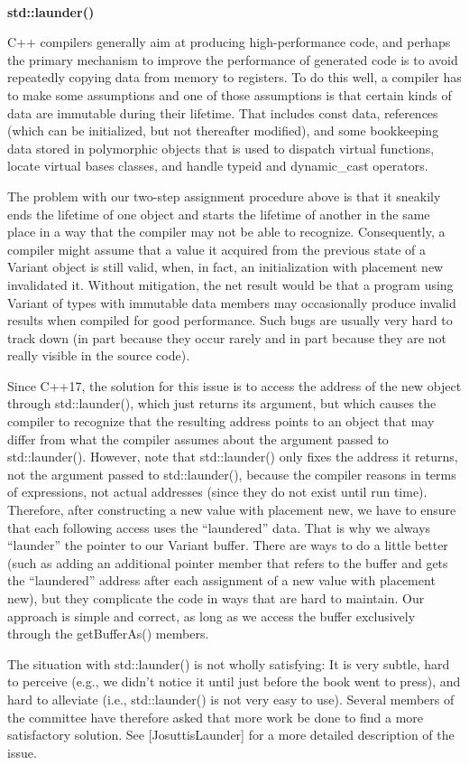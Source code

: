 \hspace*{\fill} \\ %
\noindent
\textbf{std::launder()}

C++ compilers generally aim at producing high-performance code, and perhaps the primary mechanism to improve the performance of generated code is to avoid repeatedly copying data from memory to registers. To do this well, a compiler has to make some assumptions and one of those assumptions is that certain kinds of data are immutable during their lifetime. That includes const data, references (which can be initialized, but not thereafter modified), and some bookkeeping data stored in polymorphic objects that is used to dispatch virtual functions, locate virtual bases classes, and handle typeid and dynamic\_cast operators.

The problem with our two-step assignment procedure above is that it sneakily ends the lifetime of one object and starts the lifetime of another in the same place in a way that the compiler may not be able to recognize. Consequently, a compiler might assume that a value it acquired from the previous state of a Variant object is still valid, when, in fact, an initialization with placement new invalidated it. Without mitigation, the net result would be that a program using Variant of types with immutable data members may occasionally produce invalid results when compiled for good performance. Such bugs are usually very hard to track down (in part because they occur rarely and in part because they are not really visible in the source code).

Since C++17, the solution for this issue is to access the address of the new object through std::launder(), which just returns its argument, but which causes the compiler to recognize that the resulting address points to an object that may differ from what the compiler assumes about the argument passed to std::launder(). However, note that std::launder() only fixes the address it returns, not the argument passed to std::launder(), because the compiler reasons in terms of expressions, not actual addresses (since they do not exist until run time). Therefore, after constructing a new value with placement new, we have to ensure that each following access uses the “laundered” data. That is why we always “launder” the pointer to our Variant buffer. There are ways to do a little better (such as adding an additional pointer member that refers to the buffer and gets the “laundered” address after each assignment of a new value with placement new), but they complicate the code in ways that are hard to maintain. Our approach is simple and correct, as long as we access the buffer exclusively through the getBufferAs() members.

The situation with std::launder() is not wholly satisfying: It is very subtle, hard to perceive (e.g., we didn’t notice it until just before the book went to press), and hard to alleviate (i.e., std::launder() is not very easy to use). Several members of the committee have therefore asked that more work be done to find a more satisfactory solution. See [JosuttisLaunder] for a more detailed
description of the issue.